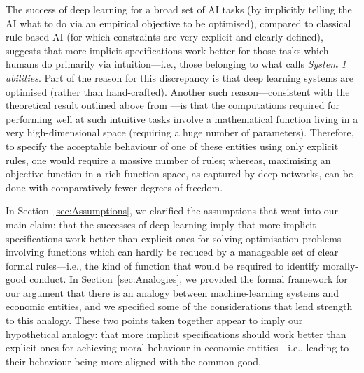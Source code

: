 \documentclass{amsart}
\theoremstyle{indented}
\theoremstyle{indentedProp}
\theoremstyle{indented}
\theoremstyle{indented}
\theoremstyle{indented}
\theoremstyle{indented}
\theoremstyle{indented}
\begin{document}
The success of deep learning for a broad set of AI tasks (by implicitly telling the AI what to do via an empirical objective to be optimised), compared to classical rule-based AI (for which constraints are very explicit and clearly defined), suggests that more implicit specifications work better for those tasks which humans do primarily via intuition---i.e., those belonging to what \citet{Kahneman-2011} calls {\it System 1 abilities}. Part of the reason for this discrepancy is that deep learning systems are optimised (rather than hand-crafted). Another such reason---consistent with the theoretical result outlined above from \citet{Montufar-et-al-NIPS2014}---is that the computations required for performing well at such intuitive tasks involve a mathematical function living in a very high-dimensional space (requiring a huge number of parameters). Therefore, to specify the acceptable behaviour of one of these entities using only explicit rules, one would require a massive number of rules; whereas, maximising an objective function in a rich function space, as captured by deep networks, can be done with comparatively fewer degrees of freedom.

In Section~\ref{sec:Assumptions}, we clarified the assumptions that went into our main claim: that the successes of deep learning imply that more implicit specifications work better than explicit ones for solving optimisation problems involving functions which can hardly be reduced by a manageable set of clear formal rules---i.e., the kind of function that would be required to identify morally-good conduct. In Section~\ref{sec:Analogies}, we provided the formal framework for our argument that there is an analogy between machine-learning systems and economic entities, and we specified some of the considerations that lend strength to this analogy. These two points taken together appear to imply our hypothetical analogy: that more implicit specifications should work better than explicit ones for achieving moral behaviour in economic entities---i.e., leading to their behaviour being more aligned with the common good.
\end{document}
